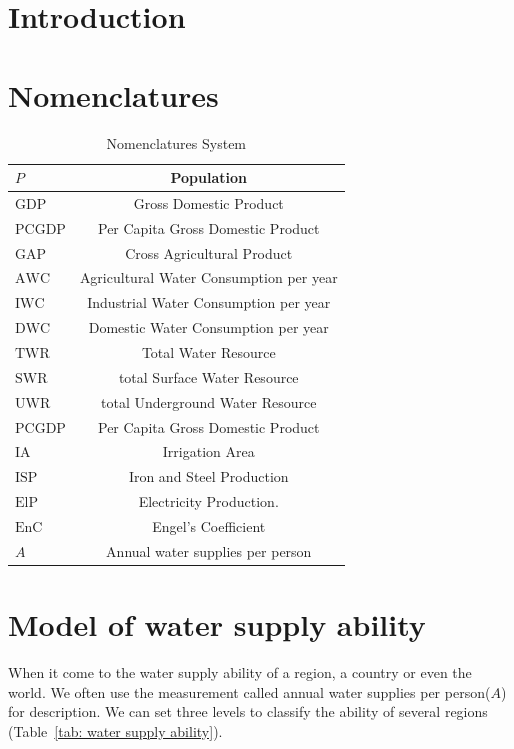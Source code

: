 
\section{Introduction}

\section{Nomenclatures}

\begin{table}[!htb]

  \centering
  \begin{tabular}{||l|c||}
    \hline
    $P$   & Population \\
    \hline
    $\text{GDP}$ & Gross Domestic Product \\
    \hline
    $\text{PCGDP}$ & Per Capita Gross Domestic Product \\
    \hline
    $\text{GAP}$ & Cross Agricultural Product \\
    \hline
    $\text{AWC}$ & Agricultural Water Consumption per year \\
    \hline
    $\text{IWC}$ & Industrial Water Consumption per year \\
    \hline
    $\text{DWC}$ & Domestic Water Consumption per year \\
    \hline
    $\text{TWR}$ & Total Water Resource \\
    \hline
    $\text{SWR}$ & total Surface Water Resource \\
    \hline
    $\text{UWR}$ & total Underground Water Resource \\
    \hline
    $\text{PCGDP}$ & Per Capita Gross Domestic Product \\
    \hline
    $\text{IA}$ & Irrigation Area \\
    \hline
    $\text{ISP}$ & Iron and Steel Production \\
    \hline
    $\text{ElP}$ & Electricity Production. \\
    \hline
    $\text{EnC}$ & Engel's Coefficient \\
    \hline
    $A$          & Annual water supplies per person \\
    \hline
  \end{tabular}
  \caption{Nomenclatures System}
  \label{tab: Nomenclatures sys}
\end{table}

\section{Model of water supply ability}
  When it come to the water supply ability of a region, a country or even the world. We often use the measurement called annual water supplies per person($A$) for description\cite{AbilityMeasure}. We can set three levels to classify the ability of several regions (Table~\ref{tab: water supply ability}).

